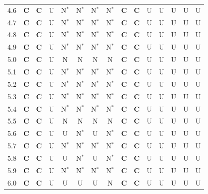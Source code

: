 {\begin{center}
\begin{tabular}{lcccccccccccccc}
\rule[-3pt]{0pt}{11.5pt} 4.6 & \textbf{C} & \textbf{C} & U & N$^{*}$ & N$^{*}$ & N$^{*}$ & N$^{*}$ & \textbf{C} & \textbf{C} & U & U & U & U & U \\
\rule[-3pt]{0pt}{11.5pt} 4.7 & \textbf{C} & \textbf{C} & U & N$^{*}$ & N$^{*}$ & N$^{*}$ & N$^{*}$ & \textbf{C} & \textbf{C} & U & U & U & U & U \\
\rule[-3pt]{0pt}{11.5pt} 4.8 & \textbf{C} & \textbf{C} & U & N$^{*}$ & N$^{*}$ & N$^{*}$ & N$^{*}$ & \textbf{C} & \textbf{C} & U & U & U & U & U \\
\rule[-3pt]{0pt}{11.5pt} 4.9 & \textbf{C} & \textbf{C} & U & N$^{*}$ & N$^{*}$ & N$^{*}$ & N$^{*}$ & \textbf{C} & \textbf{C} & U & U & U & U & U \\
\rule[-3pt]{0pt}{11.5pt} 5.0 & \textbf{C} & \textbf{C} & U & N & N & N & N & \textbf{C} & \textbf{C} & U & U & U & U & U \\
\rule[-3pt]{0pt}{11.5pt} 5.1 & \textbf{C} & \textbf{C} & U & N$^{*}$ & N$^{*}$ & N$^{*}$ & N$^{*}$ & \textbf{C} & \textbf{C} & U & U & U & U & U \\
\rule[-3pt]{0pt}{11.5pt} 5.2 & \textbf{C} & \textbf{C} & U & N$^{*}$ & N$^{*}$ & N$^{*}$ & N$^{*}$ & \textbf{C} & \textbf{C} & U & U & U & U & U \\
\rule[-3pt]{0pt}{11.5pt} 5.3 & \textbf{C} & \textbf{C} & U & N$^{*}$ & N$^{*}$ & N$^{*}$ & N$^{*}$ & \textbf{C} & \textbf{C} & U & U & U & U & U \\
\rule[-3pt]{0pt}{11.5pt} 5.4 & \textbf{C} & \textbf{C} & U & N$^{*}$ & N$^{*}$ & N$^{*}$ & N$^{*}$ & \textbf{C} & \textbf{C} & U & U & U & U & U \\
\rule[-3pt]{0pt}{11.5pt} 5.5 & \textbf{C} & \textbf{C} & U & N & N & N & N & \textbf{C} & \textbf{C} & U & U & U & U & U \\
\rule[-3pt]{0pt}{11.5pt} 5.6 & \textbf{C} & \textbf{C} & U & U & N$^{*}$ & U & N$^{*}$ & \textbf{C} & \textbf{C} & U & U & U & U & U \\
\rule[-3pt]{0pt}{11.5pt} 5.7 & \textbf{C} & \textbf{C} & U & N$^{*}$ & N$^{*}$ & N$^{*}$ & N$^{*}$ & \textbf{C} & \textbf{C} & U & U & U & U & U \\
\rule[-3pt]{0pt}{11.5pt} 5.8 & \textbf{C} & \textbf{C} & U & U & N$^{*}$ & U & N$^{*}$ & \textbf{C} & \textbf{C} & U & U & U & U & U \\
\rule[-3pt]{0pt}{11.5pt} 5.9 & \textbf{C} & \textbf{C} & U & N$^{*}$ & N$^{*}$ & N$^{*}$ & N$^{*}$ & \textbf{C} & \textbf{C} & U & U & U & U & U \\
\rule[-3pt]{0pt}{11.5pt} 6.0 & \textbf{C} & \textbf{C} & U & U & U & U & N & \textbf{C} & \textbf{C} & U & U & U & U & U \\
\bottomrule
\end{tabular}\end{center}
}
